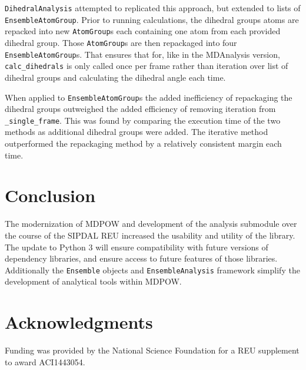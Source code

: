\documentclass{article}[letterpaper, margins=1in, 12pt]
\begin{document}
\texttt{DihedralAnalysis} attempted to replicated this approach, but extended to lists of \texttt{EnsembleAtomGroup}. Prior to running calculations, the dihedral groups atoms are repacked into new \texttt{AtomGroup}s each containing one atom from each provided dihedral group. Those \texttt{AtomGroup}s are then repackaged into four \texttt{EnsembleAtomGroup}s. That ensures that for, like in the MDAnalysis version, \lstinline{calc_dihedrals} is only called once per frame rather than iteration over list of dihedral groups and calculating the dihedral angle each time.

When applied to \texttt{EnsembleAtomGroup}s the added inefficiency of repackaging the dihedral groups outweighed the added efficiency of removing iteration from \lstinline{_single_frame}. This was found by comparing the execution time of the two methods as additional dihedral groups were added. The iterative method outperformed the repackaging method by a relatively consistent margin each time.

\section{Conclusion}
The modernization of MDPOW and development of the analysis submodule over the course of the SIPDAL REU increased the usability and utility of the library. The update to Python 3 will ensure compatibility with future versions of dependency libraries, and ensure access to future features of those libraries. Additionally the \texttt{Ensemble} objects and \texttt{EnsembleAnalysis} framework simplify the development of analytical tools within MDPOW.

\section*{Acknowledgments}
Funding was provided by the National Science Foundation for a REU supplement to award ACI1443054. 

\printbibliography
\end{document}
